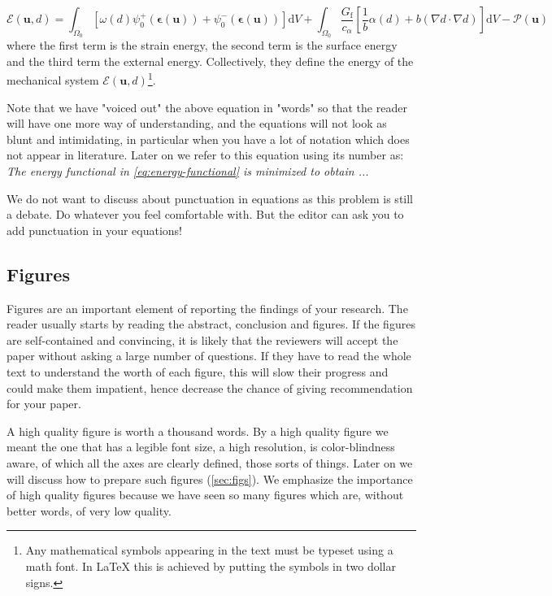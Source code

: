 \documentclass[authoryear,12pta4paper,fleqn]{article}
\newcommand{\bfepsilon}{\boldsymbol{\epsilon}}
\newcommand{\bfu}{\boldsymbol{u}}
\newcommand{\td}{\text{d}}
\newcommand{\latex}{\LaTeX\xspace}
\numberwithin{equation}{section}
\theoremstyle{remark}
\begin{document}
\begin{equation}
  \mathscr{E} (\bfu, d) 
    = \int_{\varOmega_{0}} \left[\omega(d)\psi_{0}^+(\bfepsilon (\bfu)) + \psi_{0}^-(\bfepsilon (\bfu)) \right]\td V
    + \int_{\varOmega_{0}}  \frac{G_\text{f}}{c_\alpha} \left[ \frac{1}{b} \alpha(d)
    + b \left( \nabla d \cdot \nabla d \right) \right] \td V
    - \mathscr{P} (\bfu)   
\label{eq:energy-functional}
\end{equation}
where the first term is the strain energy, the second term is the surface energy and the third term the external energy. Collectively, they define the energy of the mechanical system $\mathscr{E} (\bfu, d)$\footnote{Any mathematical symbols appearing in the text must be typeset using a math font. In \latex this is achieved by putting the symbols in two dollar signs. }.  

Note that we have "voiced out" the above equation in "words" so that the reader will have one more way of understanding, and the equations will not look as blunt and intimidating, in particular when you have a lot of notation which does not appear in literature. Later on we refer to this equation using its number as: \textit{The energy functional in \cref{eq:energy-functional} is minimized to obtain ...}

We do not want to discuss about punctuation in equations as this problem is still a debate. Do whatever you feel comfortable with. But the editor can ask you to add punctuation in your equations!



\subsection{Figures}\label{sec:citing-figs}

Figures  are  an important element of reporting the findings of your research. The reader usually starts by reading the abstract, conclusion and figures. If the figures are self-contained and convincing, it is likely that the reviewers will accept the paper without asking a large number of questions. If they have to read the whole text to understand the worth of each figure, this will slow their progress and could make them impatient, hence decrease the chance of giving recommendation for your paper. 

A high quality figure is worth a thousand words. By a high quality figure we meant the one that has a legible font size, a high resolution, is color-blindness aware, of which all the axes are clearly defined, those sorts of things. Later on we will discuss how to prepare such figures (\cref{sec:figs}). We emphasize the importance of high quality figures because we have seen so many figures which are, without better words, of very low quality.
\end{document}
